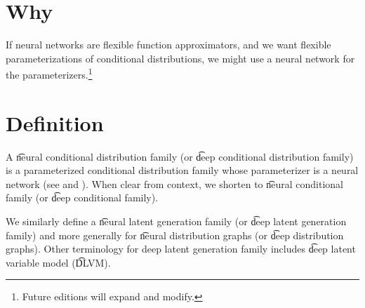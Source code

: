 

\section*{Why}

If neural networks are flexible function approximators, and we want flexible parameterizations of conditional distributions, we might use a neural network for the parameterizers.\footnote{Future editions will expand and modify.}

\section*{Definition}

A \t{neural conditional distribution family} (or \t{deep conditional distribution family}) is a parameterized conditional distribution family whose parameterizer is a neural network (see and ).
When clear from context, we shorten to \t{neural conditional family} (or \t{deep conditional family}).

We similarly define a \t{neural latent generation family} (or \t{deep latent generation family}) and more generally for \t{neural distribution graphs} (or \t{deep distribution graphs}).
Other terminology for deep latent generation family includes \t{deep latent variable model} (\t{DLVM}).

\blankpage